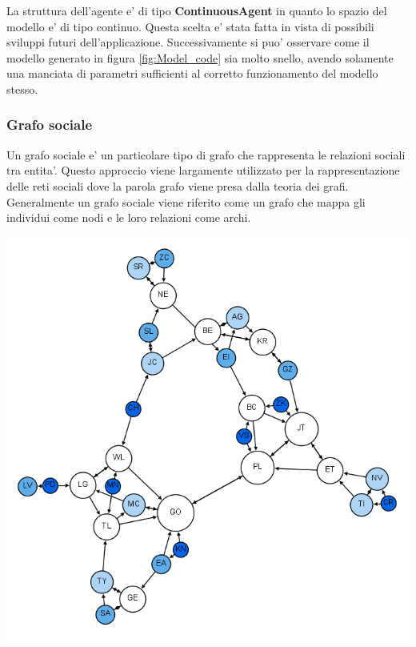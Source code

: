La struttura dell'agente e' di tipo \textbf{ContinuousAgent} in quanto lo 
spazio del modello e' di tipo continuo. Questa scelta e' stata fatta in vista di possibili 
sviluppi futuri dell'applicazione. Successivamente si puo' osservare come il modello generato 
in figura \ref{fig:Model_code} sia molto snello, avendo solamente una manciata di parametri 
sufficienti al corretto funzionamento del modello stesso. 

\subsubsection*{Grafo sociale}
Un grafo sociale e' un particolare tipo di grafo che rappresenta le relazioni sociali tra entita'.
Questo approccio viene largamente utilizzato per la rappresentazione delle reti sociali dove la 
parola grafo viene presa dalla teoria dei grafi. Generalmente un grafo sociale viene riferito come un
grafo che mappa gli individui come nodi e le loro relazioni come archi. \cite{wiki:Social_graph}

\begin{minipage}{\linewidth}
    \centering
    \includegraphics[width=\textwidth]{img/Moreno_Sociogram_3rd_Grade.png}
    \label{fig:social_graph}
\end{minipage}

